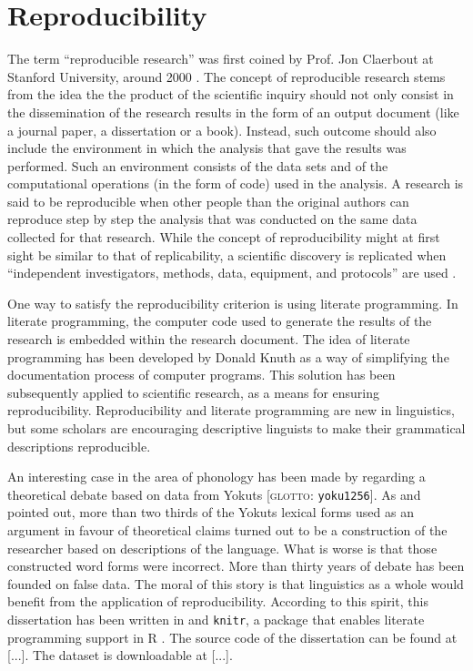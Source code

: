 \documentclass[11pt,a4paper,openany]{memoir}\usepackage[]{graphicx}\usepackage[]{color}
\begin{document}
\section{Reproducibility}
The term ``reproducible research'' was first coined by Prof. Jon Claerbout at Stanford University, around 2000 \citep{fomel2009}.
The concept of reproducible research stems from the idea the the product of the scientific inquiry should not only consist in the dissemination of the research results in the form of an output document (like a journal paper, a dissertation or a book).
Instead, such outcome should also include the environment in which the analysis that gave the results was performed.
Such an environment consists of the data sets and of the computational operations (in the form of code) used in the analysis.
A research is said to be reproducible when other people than the original authors can reproduce step by step the analysis that was conducted on the same data collected for that research.
While the concept of reproducibility might at first sight be similar to that of replicability, a scientific discovery is replicated when ``independent investigators, methods, data, equipment, and protocols'' are used \citep{peng2009}.

One way to satisfy the reproducibility criterion is using literate programming.
In literate programming, the computer code used to generate the results of the research is embedded within the research document.
The idea of literate programming has been developed by Donald Knuth \citep{knuth1984} as a way of simplifying the documentation process of computer programs.
This solution has been subsequently applied to scientific research, as a means for ensuring reproducibility.
Reproducibility and literate programming are new in linguistics, but some scholars are encouraging descriptive linguists to make their grammatical descriptions reproducible.

An interesting case in the area of phonology has been made by \citet{maxwell2013} regarding a theoretical debate based on data from Yokuts [\textsc{glotto}: \texttt{yoku1256}].
As \citet{weigel2002} and \citet{blevins2004a} pointed out, more than two thirds of the Yokuts lexical forms used as an argument in favour of theoretical claims turned out to be a construction of the researcher based on descriptions of the language.
What is worse is that those constructed word forms were incorrect.
More than thirty years of debate has been founded on false data.
The moral of this story is that linguistics as a whole would benefit from the application of reproducibility.
According to this spirit, this dissertation has been written in \XeLaTeX{} and \texttt{knitr}, a package that enables literate programming support in R \citep{r-core-team2015}.
The source code of the dissertation can be found at [...].
The dataset is downloadable at [...].
\end{document}
